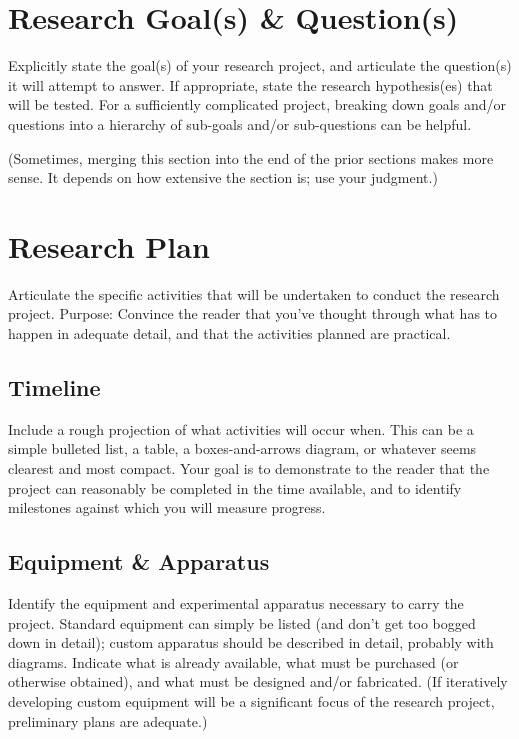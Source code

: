 \documentclass[%
 reprint,
 amsmath,amssymb,
 aps,
]{revtex4-2}
\begin{document}
\section{Research Goal(s) \& Question(s)}

Explicitly state the goal(s) of your research project, and articulate the question(s) it will attempt to answer. If appropriate, state the research hypothesis(es) that will be tested. For a sufficiently complicated project, breaking down goals and/or questions into a hierarchy of sub-goals and/or sub-questions can be helpful.

(Sometimes, merging this section into the end of the prior sections makes more sense. It depends on how extensive the section is; use your judgment.)

\section{Research Plan}

Articulate the specific activities that will be undertaken to conduct the research project. Purpose: Convince the reader that you've thought through what has to happen in adequate detail, and that the activities planned are practical.

\subsection{Timeline}

Include a rough projection of what activities will occur when. This can be a simple bulleted list, a table, a boxes-and-arrows diagram, or whatever seems clearest and most compact. Your goal is to demonstrate to the reader that the project can reasonably be completed in the time available, and to identify milestones against which you will measure progress.

\subsection{Equipment \& Apparatus}

Identify the equipment and experimental apparatus necessary to carry the project. Standard equipment can simply be listed (and don't get too bogged down in detail); custom apparatus should be described in detail, probably with diagrams. Indicate what is already available, what must be purchased (or otherwise obtained), and what must be designed and/or fabricated. (If iteratively developing custom equipment will be a significant focus of the research project, preliminary plans are adequate.)
\end{document}
